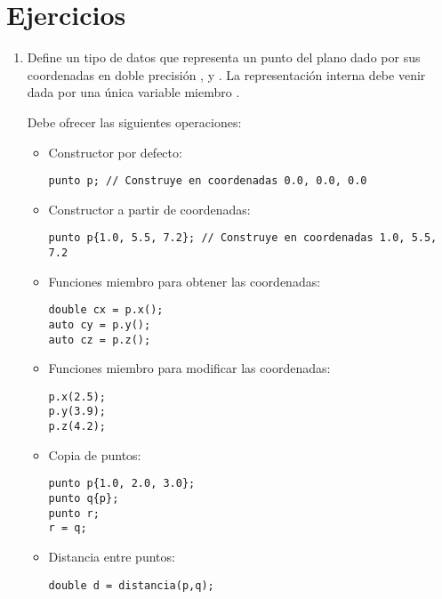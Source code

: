 \section{Ejercicios}

\begin{enumerate}

\item
Define un tipo de datos  que representa un punto del plano dado por
sus coordenadas en doble precisión ,  y . La
representación interna debe venir dada por una única variable miembro
.

Debe ofrecer las siguientes operaciones:

\begin{itemize}

\item Constructor por defecto:
\begin{lstlisting}
punto p; // Construye en coordenadas 0.0, 0.0, 0.0
\end{lstlisting}

\item Constructor a partir de coordenadas:
\begin{lstlisting}
punto p{1.0, 5.5, 7.2}; // Construye en coordenadas 1.0, 5.5, 7.2
\end{lstlisting}

\item Funciones miembro para obtener las coordenadas:
\begin{lstlisting}
double cx = p.x();
auto cy = p.y();
auto cz = p.z();
\end{lstlisting}

\item Funciones miembro para modificar las coordenadas:
\begin{lstlisting}
p.x(2.5);
p.y(3.9);
p.z(4.2);
\end{lstlisting}

\item Copia de puntos:
\begin{lstlisting}
punto p{1.0, 2.0, 3.0};
punto q{p};
punto r;
r = q;
\end{lstlisting}

\item Distancia entre puntos:
\begin{lstlisting}
double d = distancia(p,q);
\end{lstlisting}

\end{itemize}
\end{enumerate}
